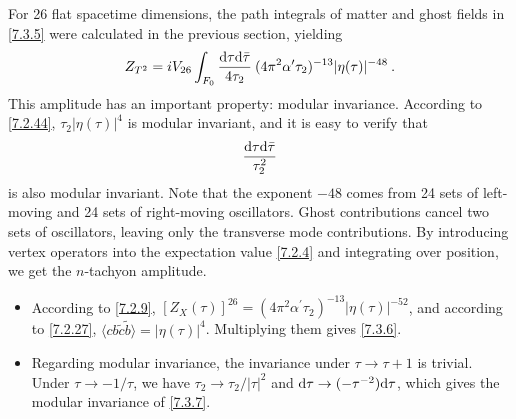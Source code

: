 For 26 flat spacetime dimensions, the path integrals of matter and ghost fields in \eqref{7.3.5} were calculated in the previous section, yielding 
\begin{equation}
	Z_{T^{2}}=i V_{26} \int_{F_{0}} \frac{\mathrm{d} \tau \mathrm{d} \bar{\tau}}{4 \tau_{2}} \: 
	(4 \pi^{2} \alpha^{\prime} \tau_{2})^{-13}|\eta(\tau)|^{-48} \:. \label{7.3.6} 
\end{equation}
This amplitude has an important property: modular invariance. According to \eqref{7.2.44}, $\tau_{2}|\eta(\tau)|^{4}$ is modular invariant, and it is easy to verify that 
\begin{equation}
	\frac{\mathrm{d} \tau \mathrm{d} \bar{\tau}}{\tau_{2}^{2}} \label{7.3.7} 
\end{equation}
is also modular invariant. Note that the exponent $-48$ comes from 24 sets of left-moving and 24 sets of right-moving oscillators. Ghost contributions cancel two sets of oscillators, leaving only the transverse mode contributions. By introducing vertex operators into the expectation value \eqref{7.2.4} and integrating over position, we get the $n$-tachyon amplitude. 
\begin{tcolorbox}
	\begin{itemize}
		\item 
		According to \eqref{7.2.9}, $[Z_{X}(\tau)]^{26}=(4 \pi^{2} \alpha^{\prime} \tau_{2})^{-13}|\eta(\tau)|^{-52}$, and according to \eqref{7.2.27}, $\langle c b \tilde{c} \tilde{b}\rangle=|\eta(\tau)|^{4}$. Multiplying them gives \eqref{7.3.6}. 
		\item Regarding modular invariance, the invariance under $\tau\to\tau+1$ is trivial. Under $\tau\to -1/\tau$, we have $\tau_{2}\to \tau_{2}/|\tau|^{2}$ and $\mathrm{d} \tau \to (-\tau^{-2})\mathrm{d}\tau$, which gives the modular invariance of \eqref{7.3.7}. 
	\end{itemize}
\end{tcolorbox}

